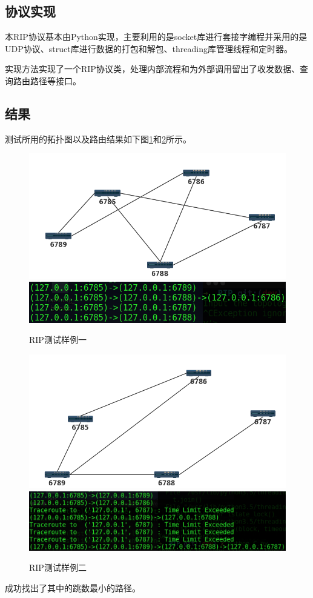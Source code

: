 	\subsection{协议实现} %
	\label{sub:协议实现}
		本RIP协议基本由Python实现，主要利用的是socket库进行套接字编程并采用的是UDP协议、struct库进行数据的打包和解包、threading库管理线程和定时器。
		\par 实现方法实现了一个RIP协议类，处理内部流程和为外部调用留出了收发数据、查询路由路径等接口。
	\subsection{结果} %
	\label{sub:结果}
		测试所用的拓扑图以及路由结果如下图\ref{fig:ripTest1}和\ref{fig:ripTest2}所示。
		\begin{figure}[H]
			\centering
			\includegraphics[scale=0.4]{imgs/topo1/tpop1.png}
			\includegraphics[scale=0.5]{imgs/ripTest1.PNG}
			\caption{RIP测试样例一}
			\label{fig:ripTest1}
		\end{figure}
		\begin{figure}[H]
			\centering
			\includegraphics[scale=0.4]{imgs/topo1/topo2.png}
			\includegraphics[scale=0.4]{imgs/ripTest2.PNG}
			\caption{RIP测试样例二}
			\label{fig:ripTest2}
		\end{figure}
		成功找出了其中的跳数最小的路径。
